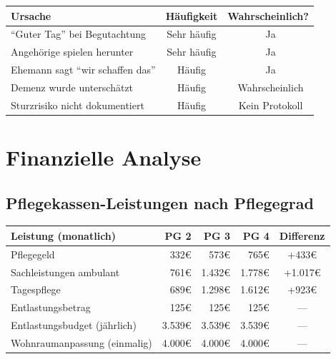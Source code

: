 \documentclass[11pt,a4paper]{article}
\newcommand{\cmark}{\ding{51}}
\begin{document}
\begin{center}
\begin{tabular}{lcc}
\toprule
\textbf{Ursache} & \textbf{Häufigkeit} & \textbf{Wahrscheinlich?} \\
\midrule
``Guter Tag'' bei Begutachtung & Sehr häufig & \cmark~Ja \\
Angehörige spielen herunter & Sehr häufig & \cmark~Ja \\
Ehemann sagt ``wir schaffen das'' & Häufig & \cmark~Ja \\
Demenz wurde unterschätzt & Häufig & \cmark~Wahrscheinlich \\
Sturzrisiko nicht dokumentiert & Häufig & \cmark~Kein Protokoll \\
\bottomrule
\end{tabular}
\end{center}

\section{Finanzielle Analyse}

\subsection{Pflegekassen-Leistungen nach Pflegegrad}

\begin{center}
\begin{tabular}{lrrrc}
\toprule
\textbf{Leistung (monatlich)} & \textbf{PG 2} & \textbf{PG 3} & \textbf{PG 4} & \textbf{Differenz} \\
\midrule
Pflegegeld & 332\euro{} & 573\euro{} & 765\euro{} & +433\euro{} \\
Sachleistungen ambulant & 761\euro{} & 1.432\euro{} & 1.778\euro{} & +1.017\euro{} \\
Tagespflege & 689\euro{} & 1.298\euro{} & 1.612\euro{} & +923\euro{} \\
Entlastungsbetrag & 125\euro{} & 125\euro{} & 125\euro{} & --- \\
\midrule
Entlastungsbudget (jährlich) & 3.539\euro{} & 3.539\euro{} & 3.539\euro{} & --- \\
Wohnraumanpassung (einmalig) & 4.000\euro{} & 4.000\euro{} & 4.000\euro{} & --- \\
\bottomrule
\end{tabular}
\end{center}
\end{document}
